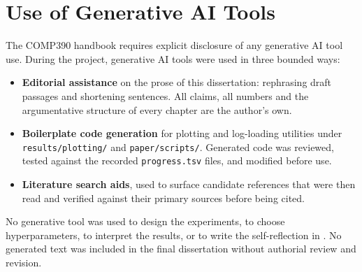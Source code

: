 \section{Use of Generative AI Tools}
\label{sec:genai}

The COMP390 handbook requires explicit disclosure of any
generative AI tool use. During the project, generative AI tools
were used in three bounded ways:
\begin{itemize}
    \item \textbf{Editorial assistance} on the prose of this
        dissertation: rephrasing draft passages and shortening
        sentences. All claims, all numbers and the argumentative
        structure of every chapter are the author's own.
    \item \textbf{Boilerplate code generation} for plotting and
        log-loading utilities under \texttt{results/plotting/}
        and \texttt{paper/scripts/}. Generated code was reviewed,
        tested against the recorded \texttt{progress.tsv} files,
        and modified before use.
    \item \textbf{Literature search aids}, used to surface
        candidate references that were then read and verified
        against their primary sources before being cited.
\end{itemize}
No generative tool was used to design the experiments, to
choose hyperparameters, to interpret the results, or to write
the self-reflection in . No generated text was
included in the final dissertation without authorial review and
revision.
